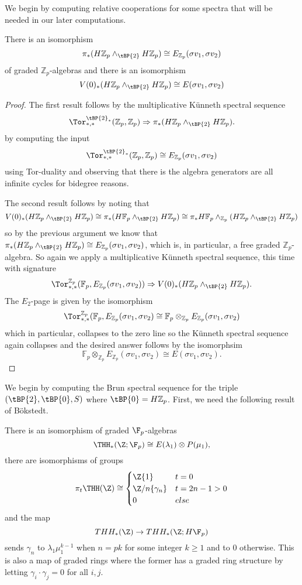 We begin by computing relative cooperations for some spectra that will be needed in our later computations. 
\begin{lem}\label{rel coop 1}
There is an isomorphism
\[ \pi_*(H\mathbb{Z}_p\wedge_{\tBP{2}}H\mathbb{Z}_p)\cong E_{\mathbb{Z}_p}(\sigma v_1, \sigma v_2) \]
of graded $\mathbb{Z}_p$-algebras
and there is an isomorphism
\[ V(0)_*(H\mathbb{Z}_p\wedge_{\tBP{2}}H\mathbb{Z}_p)\cong E(\sigma v_1, \sigma v_2) \]
\end{lem}
\begin{proof}
The first result follows by the multiplicative K\"unneth spectral sequence
\[ \Tor^{\tBP{2}_*}_{*,*}(\mathbb{Z}_p,\mathbb{Z}_p)\Rightarrow  \pi_*(H\mathbb{Z}_p\wedge_{\tBP{2}}H\mathbb{Z}_p).\]
by computing the input 
\[ \Tor^{\tBP{2}_*}_{*,*}(\mathbb{Z}_p,\mathbb{Z}_p)\cong E_{\mathbb{Z}_p}(\sigma v_1, \sigma v_2)\]
using Tor-duality and observing that there is the algebra generators are all infinite cycles for bidegree reasons. 

The second result follows by noting that 
\[ V(0)_*(H\mathbb{Z}_p\wedge_{\tBP{2} }H\mathbb{Z}_p)\cong \pi_*(H\mathbb{F}_p\wedge_{\tBP{2}}H\mathbb{Z}_p)\cong \pi_*H\mathbb{F}_p\wedge_{\mathbb{Z}_p}(H\mathbb{Z}_p\wedge_{\tBP{2}}H\mathbb{Z}_p)\]
so by the previous argument we know that $\pi_*(H\mathbb{Z}_p\wedge_{\tBP{2}}H\mathbb{Z}_p)\cong E_{\mathbb{Z}_p}(\sigma v_1,\sigma v_2)$, which is, in particular, a free graded $\mathbb{Z}_p$-algebra. So again we apply a multiplicative K\"unneth spectral sequence, this time with signature
\[\Tor^{\mathbb{Z}_p}_{*,*}(\mathbb{F}_p,E_{\mathbb{Z}_p}(\sigma v_1,\sigma v_2))\Rightarrow V(0)_*(H\mathbb{Z}_p\wedge_{\tBP{2}}H\mathbb{Z}_p).\]
The $E_2$-page is given by the isomorphism
\[ \Tor^{\mathbb{Z}_p}_{*,*}(\mathbb{F}_p,E_{\mathbb{Z}_p}(\sigma v_1,\sigma v_2)\cong \mathbb{F}_p\otimes_{\mathbb{Z}_p} E_{\mathbb{Z}_p}(\sigma v_1,\sigma v_2) \]
which in particular, collapses to the zero line so the K\"unneth spectral sequence again collapses and the desired answer follows by the isomorphsim
\[ \mathbb{F}_p\otimes_{\mathbb{Z}_p} E_{\mathbb{Z}_p}(\sigma v_1,\sigma v_2)\cong E(\sigma v_1,\sigma v_2).\]
\end{proof}
We begin by computing the Brun spectral sequence for the triple $(\tBP{2},\tBP{0},S)$ where $\tBP{0}=H\mathbb{Z}_p$. First, we need the following result of B\"okstedt. 
\begin{thm}[B\"okstedt]\label{bokstedt}
There is an isomorphism of graded $\F_p$-algebras 
\[\THH_*(\Z;\F_p)\cong E(\lambda_1)\otimes P(\mu_1),\]
there are isomorphisms of groups
	\[
	\pi_t\THH(\Z)\cong \begin{cases}
		\Z\{1\} & t=0\\
		\Z/n\{\gamma_n\} & t=2n-1>0\\
		0 & else
	\end{cases}
	\]
	and the map 
	\[ THH_*(\Z)\to THH_*(\Z;H\F_p)\]
	sends $\gamma_n$  to $\lambda_1\mu_1^{k-1}$ when $n=pk$ for some integer $k\ge 1$ and to $0$ otherwise. This is also a map of graded rings where the former has a graded ring structure by letting $\gamma_i\cdot\gamma_j=0$ for all $i,j$.	
\end{thm}
